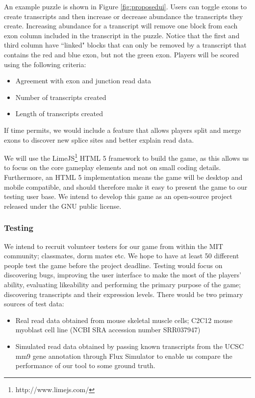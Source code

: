 \documentclass[12pt]{article}
\begin{document}
\begin{enumerate}
An example puzzle is shown in Figure \ref{fig:proposedui}. Users can toggle exons to create transcripts and then increase or decrease abundance the transcripts they create. Increasing abundance for a transcript
will remove one block from each exon column included in the transcript in the puzzle. Notice that the first and third column have ``linked" blocks that can only be removed by a transcript that contains the red and blue exon, but not the green exon. 
Players will be scored using the following criteria:
\begin{itemize}
\item Agreement with exon and junction read data
\item Number of transcripts created
\item Length of transcripts created
\end{itemize} 
If time permits, we would include a feature that allows players split and merge exons to discover new splice sites and better explain read data.
\end{enumerate}
We will use the LimeJS\footnote{http://www.limejs.com/} HTML 5 framework to build the game, as this allows us to focus on the core gameplay elements and not on small coding details. Furthermore, an HTML 5 implementation means the game will be desktop and mobile
compatible, and should therefore make it easy to present the game to our testing user base. We intend to develop this game as an open-source project released under the GNU public license.
\subsubsection*{Testing}
We intend to recruit volunteer testers for our game from within the MIT community; classmates, dorm mates etc. We hope to have at least 50 different people test the game before the project deadline. Testing would focus on discovering bugs, improving the user interface to make the most of the players' ability, evaluating likeability and performing the primary purpose of the game; discovering transcripts and their expression levels. There would be two primary sources of test data:
\begin{itemize}
\item Real read data obtained from mouse skeletal muscle cells; C2C12 mouse myoblast cell line (NCBI SRA accession number SRR037947) \citep{trapnell2010transcript}
\item Simulated read data obtained by passing known transcripts from the UCSC mm9 gene annotation \citep{karolchik2008ucsc} through Flux Simulator \citep{sammeth2010flux} to enable us compare the performance of our tool to some ground truth.
\end{itemize}
\end{document}

